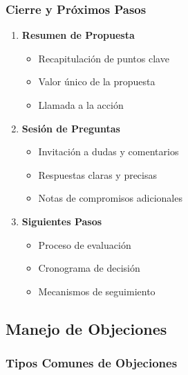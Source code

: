 \documentclass[12pt,letterpaper,oneside]{book}
\begin{document}
\subsubsection{Cierre y Próximos Pasos}

\begin{enumerate}
\item \textbf{Resumen de Propuesta}
   \begin{itemize}
   \item Recapitulación de puntos clave
   \item Valor único de la propuesta
   \item Llamada a la acción
   \end{itemize}

\item \textbf{Sesión de Preguntas}
   \begin{itemize}
   \item Invitación a dudas y comentarios
   \item Respuestas claras y precisas
   \item Notas de compromisos adicionales
   \end{itemize}

\item \textbf{Siguientes Pasos}
   \begin{itemize}
   \item Proceso de evaluación
   \item Cronograma de decisión
   \item Mecanismos de seguimiento
   \end{itemize}
\end{enumerate}

\subsection{Manejo de Objeciones}

\subsubsection{Tipos Comunes de Objeciones}
\end{document}
